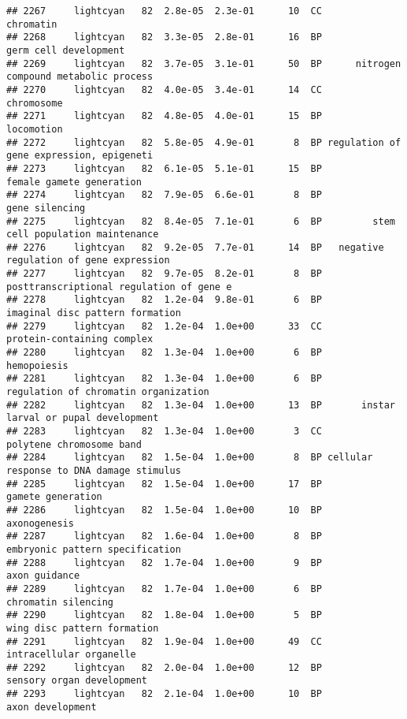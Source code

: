 \documentclass[]{article}
\begin{document}
\begin{verbatim}
## 2267     lightcyan   82  2.8e-05  2.3e-01      10  CC                                chromatin
## 2268     lightcyan   82  3.3e-05  2.8e-01      16  BP                    germ cell development
## 2269     lightcyan   82  3.7e-05  3.1e-01      50  BP      nitrogen compound metabolic process
## 2270     lightcyan   82  4.0e-05  3.4e-01      14  CC                               chromosome
## 2271     lightcyan   82  4.8e-05  4.0e-01      15  BP                               locomotion
## 2272     lightcyan   82  5.8e-05  4.9e-01       8  BP regulation of gene expression, epigeneti
## 2273     lightcyan   82  6.1e-05  5.1e-01      15  BP                 female gamete generation
## 2274     lightcyan   82  7.9e-05  6.6e-01       8  BP                           gene silencing
## 2275     lightcyan   82  8.4e-05  7.1e-01       6  BP         stem cell population maintenance
## 2276     lightcyan   82  9.2e-05  7.7e-01      14  BP   negative regulation of gene expression
## 2277     lightcyan   82  9.7e-05  8.2e-01       8  BP posttranscriptional regulation of gene e
## 2278     lightcyan   82  1.2e-04  9.8e-01       6  BP          imaginal disc pattern formation
## 2279     lightcyan   82  1.2e-04  1.0e+00      33  CC               protein-containing complex
## 2280     lightcyan   82  1.3e-04  1.0e+00       6  BP                              hemopoiesis
## 2281     lightcyan   82  1.3e-04  1.0e+00       6  BP     regulation of chromatin organization
## 2282     lightcyan   82  1.3e-04  1.0e+00      13  BP       instar larval or pupal development
## 2283     lightcyan   82  1.3e-04  1.0e+00       3  CC                 polytene chromosome band
## 2284     lightcyan   82  1.5e-04  1.0e+00       8  BP cellular response to DNA damage stimulus
## 2285     lightcyan   82  1.5e-04  1.0e+00      17  BP                        gamete generation
## 2286     lightcyan   82  1.5e-04  1.0e+00      10  BP                             axonogenesis
## 2287     lightcyan   82  1.6e-04  1.0e+00       8  BP          embryonic pattern specification
## 2288     lightcyan   82  1.7e-04  1.0e+00       9  BP                            axon guidance
## 2289     lightcyan   82  1.7e-04  1.0e+00       6  BP                      chromatin silencing
## 2290     lightcyan   82  1.8e-04  1.0e+00       5  BP              wing disc pattern formation
## 2291     lightcyan   82  1.9e-04  1.0e+00      49  CC                  intracellular organelle
## 2292     lightcyan   82  2.0e-04  1.0e+00      12  BP                sensory organ development
## 2293     lightcyan   82  2.1e-04  1.0e+00      10  BP                         axon development

\end{verbatim}
\end{document}
